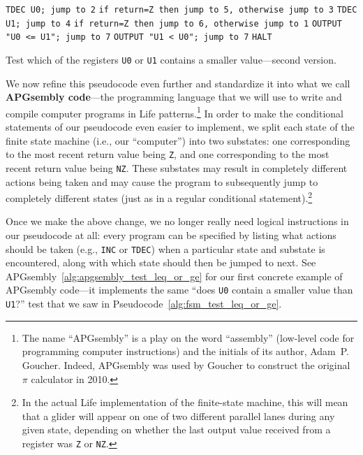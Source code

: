 \begin{pseudocode}
	\begin{algorithmic}[1]\small
		\State \texttt{TDEC U0; jump to 2}
		\State \texttt{if return=Z then jump to 5, otherwise jump to 3}
		\State \texttt{TDEC U1; jump to 4}
		\State \texttt{if return=Z then jump to 6, otherwise jump to 1}
		\State \texttt{OUTPUT "U0 <= U1"; jump to 7}
		\State \texttt{OUTPUT "U1 < U0"; jump to 7}
		\State \texttt{HALT}
	\end{algorithmic}
	\caption{Test which of the registers \texttt{U0} or \texttt{U1} contains a smaller value---second version.}\label{alg:fsm_test_leq_or_ge}
\end{pseudocode}

We now refine this pseudocode even further and standardize it into what we call \textbf{APGsembly code}---the programming language that we will use to write and compile computer programs in Life patterns.\footnote{The name ``APGsembly'' is a play on the word ``assembly'' (low-level code for programming computer instructions) and the initials of its author, Adam~P. Goucher. Indeed, APGsembly was used by Goucher to construct the original $\pi$ calculator in 2010.} In order to make the conditional statements of our pseudocode even easier to implement, we split each state of the finite state machine (i.e., our ``computer'') into two substates: one corresponding to the most recent return value being \texttt{Z}, and one corresponding to the most recent return value being \texttt{NZ}. These substates may result in completely different actions being taken and may cause the program to subsequently jump to completely different states (just as in a regular conditional statement).\footnote{In the actual Life implementation of the finite-state machine, this will mean that a glider will appear on one of two different parallel lanes during any given state, depending on whether the last output value received from a register was \texttt{Z} or \texttt{NZ}.}

Once we make the above change, we no longer really need logical instructions in our pseudocode at all: every program can be specified by listing what actions should be taken (e.g., \texttt{INC} or \texttt{TDEC}) when a particular state and substate is encountered, along with which state should then be jumped to next. See APGsembly~\ref{alg:apgsembly_test_leq_or_ge} for our first concrete example of APGsembly code---it implements the same ``does \texttt{U0} contain a smaller value than \texttt{U1}?'' test that we saw in Pseudocode~\ref{alg:fsm_test_leq_or_ge}.

